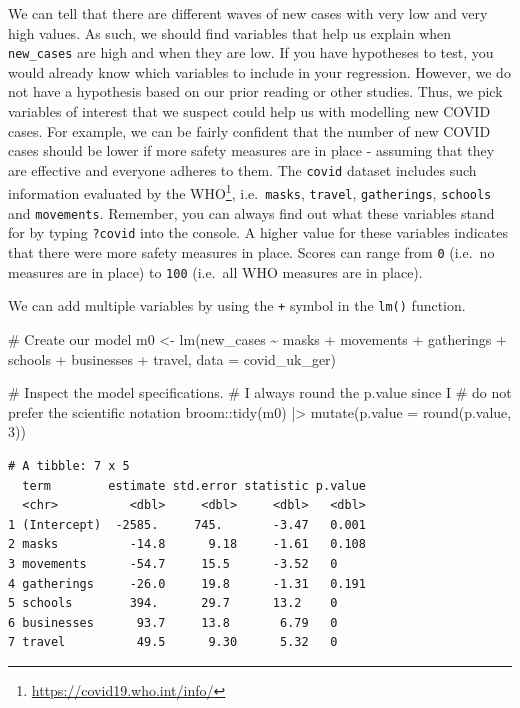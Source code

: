 \documentclass[
  letterpaper,
]{krantz}
\makeatletter
\newenvironment{Shaded}{\begin{snugshade}}{\end{snugshade}}
\newcommand{\AttributeTok}[1]{\textcolor[rgb]{0.40,0.45,0.13}{#1}}
\newcommand{\CommentTok}[1]{\textcolor[rgb]{0.37,0.37,0.37}{#1}}
\newcommand{\DecValTok}[1]{\textcolor[rgb]{0.68,0.00,0.00}{#1}}
\newcommand{\FunctionTok}[1]{\textcolor[rgb]{0.28,0.35,0.67}{#1}}
\newcommand{\NormalTok}[1]{\textcolor[rgb]{0.00,0.23,0.31}{#1}}
\newcommand{\OtherTok}[1]{\textcolor[rgb]{0.00,0.23,0.31}{#1}}
\newcommand{\SpecialCharTok}[1]{\textcolor[rgb]{0.37,0.37,0.37}{#1}}
\renewcommand{\href}[2]{#2\footnote{\url{#1}}}
\newenvironment{kframe}{%
\medskip{}
\setlength{\fboxsep}{.8em}
 \def\at@end@of@kframe{}%
 \ifinner\ifhmode%
  \def\at@end@of@kframe{\end{minipage}}%
  \begin{minipage}{\columnwidth}%
 \fi\fi%
 \def\FrameCommand##1{\hskip\@totalleftmargin \hskip-\fboxsep
 \colorbox{shadecolor}{##1}\hskip-\fboxsep
     \hskip-\linewidth \hskip-\@totalleftmargin \hskip\columnwidth}%
 \MakeFramed {\advance\hsize-\width
   \@totalleftmargin\z@ \linewidth\hsize
   \@setminipage}}%
 {\par\unskip\endMakeFramed%
 \at@end@of@kframe}
\renewenvironment{Shaded}{\begin{kframe}}{\end{kframe}}
\makeatother
\begin{document}
We can tell that there are different waves of new cases with very low
and very high values. As such, we should find variables that help us
explain when \texttt{new\_cases} are high and when they are low. If you
have hypotheses to test, you would already know which variables to
include in your regression. However, we do not have a hypothesis based
on our prior reading or other studies. Thus, we pick variables of
interest that we suspect could help us with modelling new COVID cases.
For example, we can be fairly confident that the number of new COVID
cases should be lower if more safety measures are in place - assuming
that they are effective and everyone adheres to them. The \texttt{covid}
dataset includes such information evaluated by the
\href{https://covid19.who.int/info/}{WHO}, i.e.~\texttt{masks},
\texttt{travel}, \texttt{gatherings}, \texttt{schools} and
\texttt{movements}. Remember, you can always find out what these
variables stand for by typing \texttt{?covid} into the console. A higher
value for these variables indicates that there were more safety measures
in place. Scores can range from \texttt{0} (i.e.~no measures are in
place) to \texttt{100} (i.e.~all WHO measures are in place).

We can add multiple variables by using the \texttt{+} symbol in the
\texttt{lm()} function.

\begin{Shaded}
\begin{Highlighting}[]
\CommentTok{\# Create our model}
\NormalTok{m0 }\OtherTok{\textless{}{-}} \FunctionTok{lm}\NormalTok{(new\_cases }\SpecialCharTok{\textasciitilde{}}\NormalTok{ masks }\SpecialCharTok{+}\NormalTok{ movements }\SpecialCharTok{+}\NormalTok{ gatherings }\SpecialCharTok{+}
\NormalTok{           schools }\SpecialCharTok{+}\NormalTok{ businesses }\SpecialCharTok{+}\NormalTok{ travel,}
         \AttributeTok{data =}\NormalTok{ covid\_uk\_ger)}

\CommentTok{\# Inspect the model specifications.}
\CommentTok{\# I always round the p.value since I}
\CommentTok{\# do not prefer the scientific notation}
\NormalTok{broom}\SpecialCharTok{::}\FunctionTok{tidy}\NormalTok{(m0) }\SpecialCharTok{|\textgreater{}}
  \FunctionTok{mutate}\NormalTok{(}\AttributeTok{p.value =} \FunctionTok{round}\NormalTok{(p.value, }\DecValTok{3}\NormalTok{))}
\end{Highlighting}
\end{Shaded}

\begin{verbatim}
# A tibble: 7 x 5
  term        estimate std.error statistic p.value
  <chr>          <dbl>     <dbl>     <dbl>   <dbl>
1 (Intercept)  -2585.     745.       -3.47   0.001
2 masks          -14.8      9.18     -1.61   0.108
3 movements      -54.7     15.5      -3.52   0    
4 gatherings     -26.0     19.8      -1.31   0.191
5 schools        394.      29.7      13.2    0    
6 businesses      93.7     13.8       6.79   0    
7 travel          49.5      9.30      5.32   0    
\end{verbatim}
\end{document}
